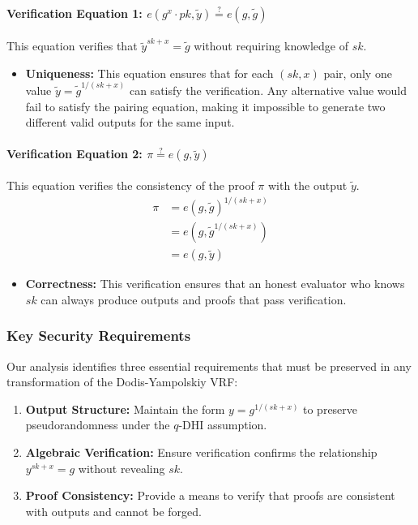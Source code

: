\paragraph{Verification Equation 1: $e(g^{x} \cdot pk, \tilde{y}) \stackrel{?}{=} e(g, \tilde{g})$}
This equation verifies that $\tilde{y}^{sk+x} = \tilde{g}$ without requiring knowledge of $sk$.

\begin{itemize}
    \item \textbf{Uniqueness:} This equation ensures that for each $(sk,x)$ pair, only one value $\tilde{y} = \tilde{g}^{1/(sk+x)}$ can satisfy the verification. Any alternative value would fail to satisfy the pairing equation, making it impossible to generate two different valid outputs for the same input.
\end{itemize}

\paragraph{Verification Equation 2: $\pi \stackrel{?}{=} e(g, \tilde{y})$}
This equation verifies the consistency of the proof $\pi$ with the output $\tilde{y}$.
\begin{align*}
    \pi &= e(g, \tilde{g})^{1/(sk + x)} \\
    &= e(g, \tilde{g}^{1/(sk + x)}) \\
    &= e(g, \tilde{y})
\end{align*}

\begin{itemize}
    \item \textbf{Correctness:} This verification ensures that an honest evaluator who knows $sk$ can always produce outputs and proofs that pass verification.
\end{itemize}

\subsubsection*{Key Security Requirements}
Our analysis identifies three essential requirements that must be preserved in any transformation of the Dodis-Yampolskiy VRF:

\begin{enumerate}
    \item \textbf{Output Structure:} Maintain the form $y = g^{1/(sk+x)}$ to preserve pseudorandomness under the $q$-DHI assumption.
    
    \item \textbf{Algebraic Verification:} Ensure verification confirms the relationship $y^{sk+x} = g$ without revealing $sk$.
    
    \item \textbf{Proof Consistency:} Provide a means to verify that proofs are consistent with outputs and cannot be forged.
\end{enumerate}

